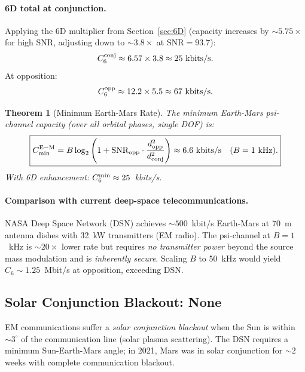 \documentclass[aps,prd,twocolumn,superscriptaddress,nofootinbib]{revtex4-2}
\newcommand{\SNR}{\mathrm{SNR}}
\newtheorem{theorem}{Theorem}
\begin{document}
\paragraph{6D total at conjunction.}
Applying the 6D multiplier from Section~\ref{sec:6D} (capacity increases
by $\sim 5.75\times$ for high SNR, adjusting down to $\sim 3.8\times$ at
$\SNR = 93.7$):
\begin{equation}
C_6^{\rm conj} \approx 6.57 \times 3.8 \approx 25~\text{kbits/s}.
\end{equation}
At opposition:
\begin{equation}
C_6^{\rm opp} \approx 12.2 \times 5.5 \approx 67~\text{kbits/s}.
\end{equation}

\begin{theorem}[Minimum Earth-Mars Rate]
\label{thm:min-rate}
The minimum Earth-Mars psi-channel capacity (over all orbital phases,
single DOF) is:
\begin{equation}
\boxed{C_{\rm min}^{\rm E-M} = B\log_2\left(1 + \SNR_{\rm opp} \cdot \frac{d_{\rm opp}^2}{d_{\rm conj}^2}\right)
\approx 6.6~\text{kbits/s} \quad (B = 1~\text{kHz}).}
\label{eq:Cmin}
\end{equation}
With 6D enhancement: $C_6^{\rm min} \approx 25$~kbits/s.
\end{theorem}

\paragraph{Comparison with current deep-space telecommunications.}
NASA Deep Space Network (DSN) achieves $\sim 500$~kbit/s Earth-Mars
at 70~m antenna dishes with 32~kW transmitters (EM radio). The psi-channel
at $B = 1$~kHz is $\sim 20\times$ lower rate but requires \emph{no transmitter
power} beyond the source mass modulation and is \emph{inherently secure}.
Scaling $B$ to 50~kHz would yield $C_6 \sim 1.25$~Mbit/s at opposition,
exceeding DSN.

\subsection{Solar Conjunction Blackout: None}

EM communications suffer a \emph{solar conjunction blackout} when the
Sun is within $\sim 3^\circ$ of the communication line (solar plasma scattering).
The DSN requires a minimum Sun-Earth-Mars angle; in 2021, Mars was in
solar conjunction for $\sim 2$ weeks with complete communication blackout.
\end{document}

